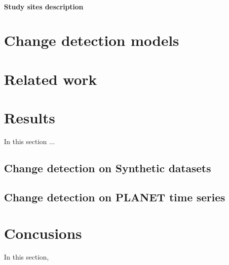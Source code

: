 \documentclass{article}
\begin{document}
\paragraph{Study sites description} 



 
\section{Change detection models}














\section{Related work}
\label{sec:related-work}

\section{Results}
\label{sec:methods}

In this section ...
\subsection{Change detection on Synthetic datasets}

\subsection{Change detection on PLANET time series}


\section{Concusions}
\label{sec:results}
In this section, 





\end{document}
